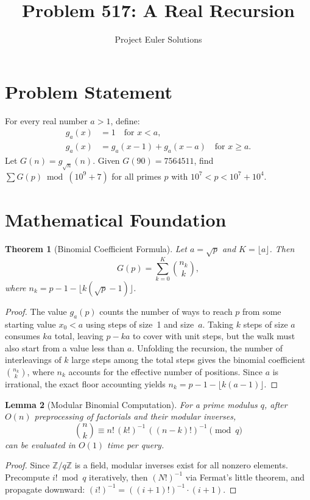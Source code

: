 \documentclass[11pt]{article}
\title{Problem 517: A Real Recursion}
\author{Project Euler Solutions}
\date{}
\newtheorem{theorem}{Theorem}
\newtheorem{lemma}[theorem]{Lemma}
\begin{document}
\maketitle

\section{Problem Statement}

For every real number $a > 1$, define:
\begin{align*}
g_a(x) &= 1 \quad \text{for } x < a, \\
g_a(x) &= g_a(x-1) + g_a(x-a) \quad \text{for } x \geq a.
\end{align*}
Let $G(n) = g_{\sqrt{n}}(n)$. Given $G(90) = 7564511$, find $\sum G(p) \bmod (10^9+7)$ for all primes $p$ with $10^7 < p < 10^7 + 10^4$.

\section{Mathematical Foundation}

\begin{theorem}[Binomial Coefficient Formula]
Let $a = \sqrt{p}$ and $K = \lfloor a \rfloor$. Then
\[
G(p) = \sum_{k=0}^{K}\binom{n_k}{k},
\]
where $n_k = p - 1 - \lfloor k(\sqrt{p} - 1)\rfloor$.
\end{theorem}

\begin{proof}
The value $g_a(p)$ counts the number of ways to reach $p$ from some starting value $x_0 < a$ using steps of size~1 and size~$a$. Taking $k$ steps of size $a$ consumes $ka$ total, leaving $p - ka$ to cover with unit steps, but the walk must also start from a value less than $a$. Unfolding the recursion, the number of interleavings of $k$ large steps among the total steps gives the binomial coefficient $\binom{n_k}{k}$, where $n_k$ accounts for the effective number of positions. Since $a$ is irrational, the exact floor accounting yields $n_k = p - 1 - \lfloor k(a - 1)\rfloor$.
\end{proof}

\begin{lemma}[Modular Binomial Computation]
For a prime modulus $q$, after $O(n)$ preprocessing of factorials and their modular inverses,
\[
\binom{n}{k} \equiv n!\,(k!)^{-1}\,((n-k)!)^{-1} \pmod{q}
\]
can be evaluated in $O(1)$ time per query.
\end{lemma}

\begin{proof}
Since $\mathbb{Z}/q\mathbb{Z}$ is a field, modular inverses exist for all nonzero elements. Precompute $i! \bmod q$ iteratively, then $(N!)^{-1}$ via Fermat's little theorem, and propagate downward: $(i!)^{-1} = ((i+1)!)^{-1} \cdot (i+1)$.
\end{proof}
\end{document}
